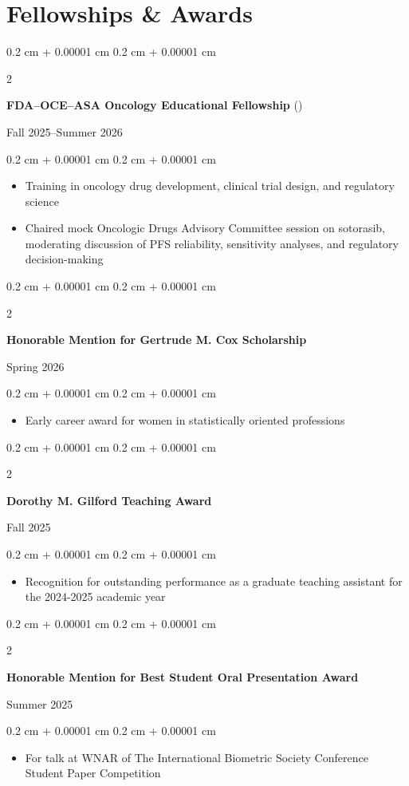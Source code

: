 \documentclass[10pt, letterpaper]{article}
\newenvironment{highlights}{
    \begin{itemize}[
        topsep=0.10 cm,
        parsep=0.10 cm,
        partopsep=0pt,
        itemsep=0pt,
        leftmargin=0.4 cm + 10pt
    ]
}{
    \end{itemize}
} %
\newenvironment{onecolentry}{
    \begin{adjustwidth}{
        0.2 cm + 0.00001 cm
    }{
        0.2 cm + 0.00001 cm
    }
}{
    \end{adjustwidth}
    \vspace{0.2cm} %
}
\newenvironment{twocolentry}[2][]{
    \onecolentry
    \def\secondColumn{#2}
    \setcolumnwidth{\fill, 4.5 cm}
    \begin{paracol}{2}
}{
    \switchcolumn \raggedleft \secondColumn
    \end{paracol}
    \endonecolentry
}
\let\hrefWithoutArrow\href
\renewcommand{\href}[2]{\hrefWithoutArrow{#1}{\ifthenelse{\equal{#2}{}}{ }{#2 }\raisebox{.15ex}{\footnotesize \faExternalLink*}}}
\begin{document}
\section{Fellowships \& Awards}

\begin{twocolentry}{Fall 2025--Summer 2026}
    \textbf{FDA–OCE–ASA Oncology Educational Fellowship} (\href{https://stat.uw.edu/news-resources/articles/kayla-irish-receives-fda-oce-asa-oncology-educational-fellowship}{article})
\end{twocolentry}
\begin{onecolentry}
    \begin{highlights}
        \item[] Training in oncology drug development, clinical trial design, and regulatory science
        \item[] Chaired mock Oncologic Drugs Advisory Committee session on sotorasib, moderating discussion of PFS reliability, sensitivity analyses, and regulatory decision-making
    \end{highlights}
\end{onecolentry}

\begin{twocolentry}{Spring 2026}
    \textbf{Honorable Mention for Gertrude M. Cox Scholarship}
\end{twocolentry}
\begin{onecolentry}
    \begin{highlights}
        \item[] Early career award for women in statistically oriented professions
    \end{highlights}
\end{onecolentry}

\begin{twocolentry}{Fall 2025}
    \textbf{Dorothy M. Gilford Teaching Award}
\end{twocolentry}
\begin{onecolentry}
    \begin{highlights}
        \item[] Recognition for outstanding performance as a graduate teaching assistant for the 2024-2025 academic year
    \end{highlights}
\end{onecolentry}

\begin{twocolentry}{Summer 2025}
    \textbf{Honorable Mention for Best Student Oral Presentation Award}
\end{twocolentry}
\begin{onecolentry}
    \begin{highlights}
        \item[] For talk at WNAR of The International Biometric Society Conference Student Paper Competition
    \end{highlights}
\end{onecolentry}
\end{document}
